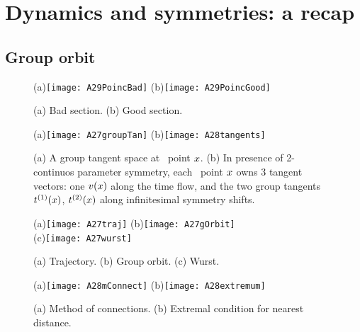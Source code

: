 
\section{Dynamics and symmetries: a recap}
\label{s:cut}

\subsection{Group orbit}


    \ifdraft\color{blue}
\begin{figure}
   \centering
(a)\texttt{[image: A29PoincBad]}
(b)\texttt{[image: A29PoincGood]}
   \caption{\label{fig:A29PoincBad}
    (a)
Bad section.
    (b)
Good section.
}
\end{figure}

\begin{figure}
   \centering
(a)\texttt{[image: A27groupTan]}
(b)\texttt{[image: A28tangents]}
   \caption{\label{fig:tangents}
    (a)
A group tangent space at \statesp\ point $x$.
    (b)
In presence of 2-continuos parameter symmetry, each \statesp\ point
$x$ owns 3 tangent vectors: one $v(x)$ along the time flow, and
the two group tangents $t^{(1)}(x)$, $t^{(2)}(x)$
along infinitesimal symmetry shifts.
}
\end{figure}

\begin{figure}
   \centering
(a)\texttt{[image: A27traj]}
(b)\texttt{[image: A27gOrbit]}
    \\
(c)\texttt{[image: A27wurst]}
   \caption{\label{fig:A27wurst}
    (a)
Trajectory.
    (b)
Group orbit.
    (c)
Wurst.
}
\end{figure}

\begin{figure}
   \centering
(a)\texttt{[image: A28mConnect]}
(b)\texttt{[image: A28extremum]}
   \caption{\label{fig:A28extremum}
    (a)
Method of connections.
    (b)
Extremal condition for nearest distance.
}
\end{figure}


